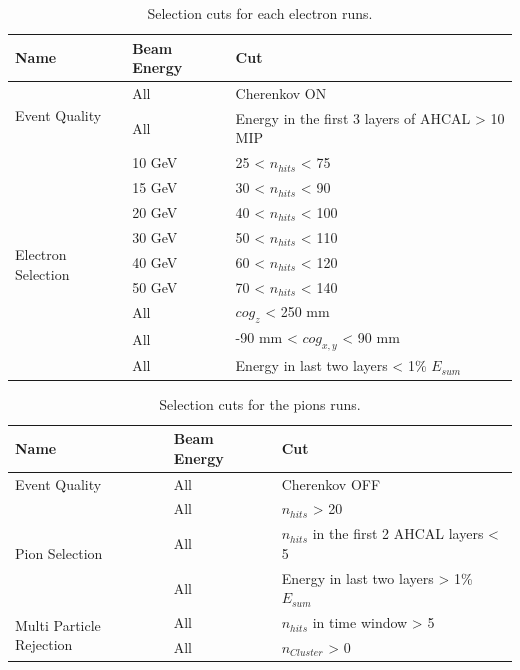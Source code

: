 \documentclass{JINST}
\begin{document}
\begin{table}[htb!]
  \centering
  \caption{Selection cuts for each electron runs.}
  \label{table:electron_sel}
  \begin{tabular}{@{}lll@{}}
    \toprule
    \multicolumn{1}{l}{\textbf{Name}} & \textbf{Beam Energy} & \textbf{Cut}\\
    \midrule
    \multirow{2}{*}{Event Quality}& All & Cherenkov ON\\& All & Energy in the first 3 layers of AHCAL > 10 MIP \\
    \multirow{9}{*}{Electron Selection}& 10 GeV & 25 < $n_{hits}$ < 75 \\& 15 GeV & 30 < $n_{hits}$ < 90 \\& 20 GeV & 40 < $n_{hits}$ < 100 \\& 30 GeV & 50 < $n_{hits}$ < 110 \\& 40 GeV & 60 < $n_{hits}$ < 120 \\& 50 GeV & 70 < $n_{hits}$ < 140 \\& All & $cog_{z}$ < 250 mm\\& All & -90 mm < $cog_{x, y}$ < 90 mm \\& All & Energy in last two layers < 1\% $E_{sum}$ \\
    \bottomrule
  \end{tabular}
\end{table}

\begin{table}[htb!]
  \centering
  \caption{Selection cuts for the pions runs.}
  \label{table:pion_sel}
  \begin{tabular}{@{}lll@{}}
    \toprule
    \multicolumn{1}{l}{\textbf{Name}} & \textbf{Beam Energy} & \textbf{Cut}\\
    \midrule
    \multirow{1}{*}{Event Quality}& All & Cherenkov OFF\\
    \multirow{3}{*}{Pion Selection}& All & $n_{hits}$ > 20 \\& All & $n_{hits}$ in the first 2 AHCAL layers < 5 \\& All & Energy in last two layers > 1\% $E_{sum}$ \\
    \multirow{2}{*}{Multi Particle Rejection}& All & $n_{hits}$ in time window > 5 \\& All & $n_{Cluster}$ > 0 \\
    \bottomrule
  \end{tabular}
\end{table}
\end{document}
